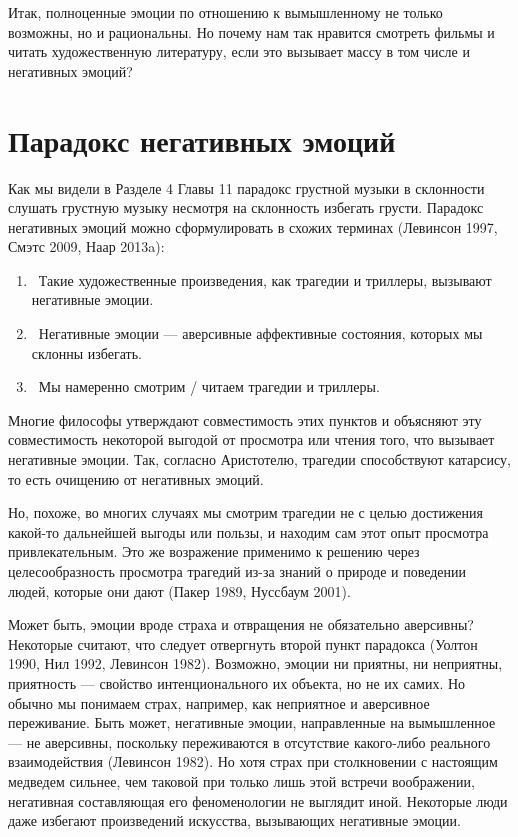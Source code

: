 \documentclass[11pt]{book}
\begin{document}
Итак, полноценные эмоции по отношению к вымышленному не только возможны, но и рациональны. Но почему нам так нравится смотреть фильмы и читать художественную литературу, если это вызывает массу в том числе и негативных эмоций?

\section{Парадокс негативных эмоций}

Как мы видели в Разделе 4 Главы 11 парадокс грустной музыки в склонности слушать грустную музыку несмотря на склонность избегать грусти. Парадокс негативных эмоций можно сформулировать в схожих терминах (Левинсон 1997, Смэтс 2009, Наар 2013a):

\begin{enumerate}
  \item\ Такие художественные произведения, как трагедии и триллеры, вызывают негативные эмоции.
  \item\ Негативные эмоции --- аверсивные аффективные состояния, которых мы склонны избегать.
  \item\ Мы намеренно смотрим / читаем трагедии и триллеры.
\end{enumerate}

Многие философы утверждают совместимость этих пунктов и объясняют эту совместимость некоторой выгодой от просмотра или чтения того, что вызывает негативные эмоции. Так, согласно Аристотелю, трагедии способствуют катарсису, то есть очищению от негативных эмоций.

Но, похоже, во многих случаях мы смотрим трагедии не с целью достижения какой-то дальнейшей выгоды или пользы, и находим сам этот опыт просмотра привлекательным. Это же возражение применимо к решению через целесообразность просмотра трагедий из-за знаний о природе и поведении людей, которые они дают (Пакер 1989, Нуссбаум 2001).

Может быть, эмоции вроде страха и отвращения не обязательно аверсивны? Некоторые считают, что следует отвергнуть второй пункт парадокса (Уолтон 1990, Нил 1992, Левинсон 1982). Возможно, эмоции ни приятны, ни неприятны, приятность --- свойство интенционального их объекта, но не их самих. Но обычно мы понимаем страх, например, как неприятное и аверсивное переживание. Быть может, негативные эмоции, направленные на вымышленное --- не аверсивны, поскольку переживаются в отсутствие какого-либо реального взаимодействия (Левинсон 1982). Но хотя страх при столкновении с настоящим медведем сильнее, чем таковой при только лишь этой встречи воображении, негативная составляющая его феноменологии не выглядит иной. Некоторые люди даже избегают произведений искусства, вызывающих негативные эмоции.
\end{document}
